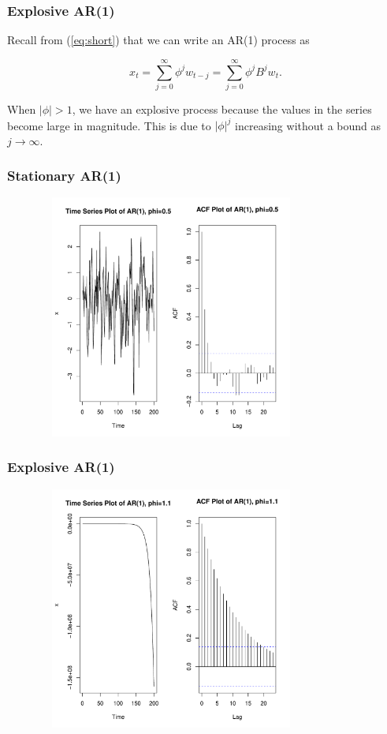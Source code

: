 \documentclass[%
xcolor=pdftex]{beamer}
\begin{document}
\begin{frame}
\frametitle{Explosive AR(1)}

Recall from (\ref{eq:short}) that we can write an AR(1) process as

$$
x_t=\sum_{j=0}^{\infty} \phi^j w_{t-j} = \sum_{j=0}^{\infty} \phi^j B^j w_t.
$$

When $|\phi| > 1$, we have an explosive process because the values in the series become large in magnitude. This is due to $|\phi|^j$ increasing without a bound as $j \rightarrow \infty$.


\end{frame}

\begin{frame}
\frametitle{Stationary AR(1)}

\includegraphics[width=110mm, height=80mm]{ar1s.pdf}

\end{frame}

\begin{frame}
\frametitle{Explosive AR(1)}

\includegraphics[width=110mm, height=80mm]{ar1ns.pdf}

\end{frame}
\end{document}

